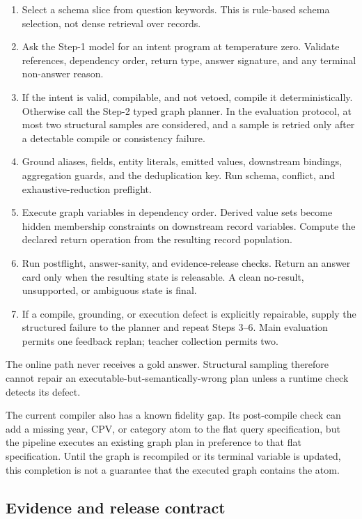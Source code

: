 \begin{enumerate}
  \item Select a schema slice from question keywords.  This is rule-based schema selection, not
  dense retrieval over records.
  \item Ask the Step-1 model for an intent program at temperature zero.  Validate references,
  dependency order, return type, answer signature, and any terminal non-answer reason.
  \item If the intent is valid, compilable, and not vetoed, compile it deterministically.  Otherwise
  call the Step-2 typed graph planner.  In the evaluation protocol, at most two structural samples
  are considered, and a sample is retried only after a detectable compile or consistency failure.
  \item Ground aliases, fields, entity literals, emitted values, downstream bindings, aggregation
  guards, and the deduplication key.  Run schema, conflict, and exhaustive-reduction preflight.
  \item Execute graph variables in dependency order.  Derived value sets become hidden membership
  constraints on downstream record variables.  Compute the declared return operation from the
  resulting record population.
  \item Run postflight, answer-sanity, and evidence-release checks.  Return an answer card only when
  the resulting state is releasable.  A clean no-result, unsupported, or ambiguous state is final.
  \item If a compile, grounding, or execution defect is explicitly repairable, supply the structured
  failure to the planner and repeat Steps 3--6.  Main evaluation permits one feedback replan;
  teacher collection permits two.
\end{enumerate}

The online path never receives a gold answer.  Structural sampling therefore cannot repair an
executable-but-semantically-wrong plan unless a runtime check detects its defect.

The current compiler also has a known fidelity gap.  Its post-compile check can add a missing year,
CPV, or category atom to the flat query specification, but the pipeline executes an existing graph
plan in preference to that flat specification.  Until the graph is recompiled or its terminal
variable is updated, this completion is not a guarantee that the executed graph contains the atom.

\subsection{Evidence and release contract}

